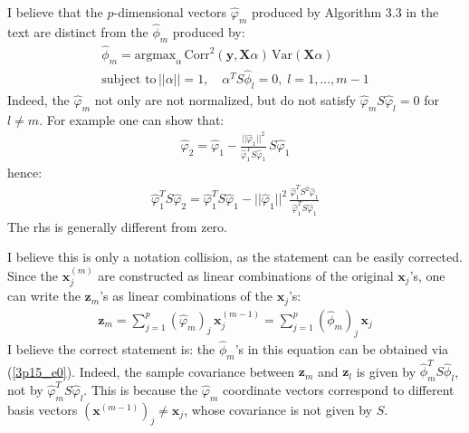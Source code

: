 


I believe that the $p$-dimensional vectors $\hat{\varphi}_m$ produced by Algorithm 3.3 in the text are distinct from the $\hat{\phi}_m$ produced by:
\begin{eqnarray} \label{3p15_e0}
\hat{\phi}_m  =  \textrm{argmax}_\alpha\, \textrm{Corr}^2 \left( \mathbf{y}, \mathbf{X} \alpha \right)\, \textrm{Var} \left( \mathbf{X} \alpha \right)\\ \nonumber
\textrm{subject to} \, ||\alpha|| = 1, \quad \alpha^T S \hat{\phi}_l = 0, \;l = 1, \ldots, m - 1
\end{eqnarray}
Indeed, the $\hat{\varphi}_m$ not only are not normalized, but do not satisfy $ \hat{\varphi}_m S \hat{\varphi}_l = 0$ for $l \neq m$. For example one can show that:
\begin{eqnarray*}
    \hat{\varphi}_2 = \hat{\varphi}_1 - \frac{||\hat{\varphi}_1||^2}{\hat{\varphi}_1^T S \hat{\varphi}_1}\, S \hat{\varphi}_1
\end{eqnarray*}
hence:
\begin{eqnarray*}
    \hat{\varphi}_1^T S \hat{\varphi}_2 = \hat{\varphi}_1^T S \hat{\varphi}_1 - ||\hat{\varphi}_1||^2 \, \frac{\hat{\varphi}_1^T S^2 \hat{\varphi}_1}{\hat{\varphi}_1^T S \hat{\varphi}_1}
\end{eqnarray*}
The rhs is generally different from zero. 

I believe this is only a notation collision, as the statement can be easily corrected.
Since the $\mathbf{x}_j^{(m)}$ are constructed as linear combinations of the original $\mathbf{x}_j$'s, one can write the $\mathbf{z}_m$'s as linear combinations of the $\mathbf{x}_j$'s:
\begin{eqnarray}  \label{3p15_e1}
\mathbf{z}_m  =   \sum_{j = 1}^p \left( \hat{\varphi}_m \right)_j  \, \mathbf{x}^{(m-1)}_j= \sum_{j = 1}^p \left( \hat{\phi}_m \right)_j \, \mathbf{x}_j
\end{eqnarray}
I believe the correct statement is: the $\hat{\phi}_m$'s in this equation can be obtained via (\ref{3p15_e0}). Indeed, the
sample covariance between $\mathbf{z}_m$ and $\mathbf{z}_l$ is given 
by $\hat{\phi}_m^T S \hat{\phi}_l$, not by $\hat{\varphi}_m^T S \hat{\varphi}_l$. This is because the $\hat{\varphi}_m$ coordinate vectors correspond to different basis vectors $(\mathbf{x}^{(m-1)})_j \neq \mathbf{x}_j$, whose
covariance is not given by $S$.

